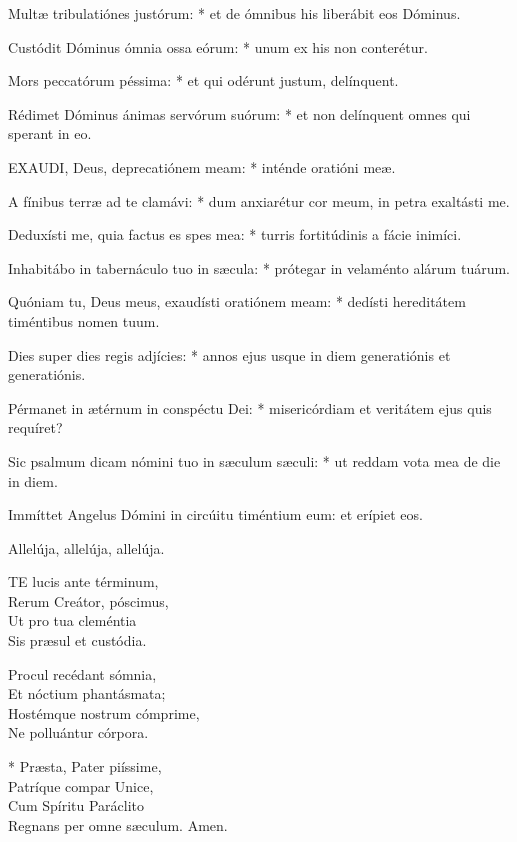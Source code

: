 Multæ tribulatiónes justórum: * et de ómnibus his liberábit eos Dóminus.

Custódit Dóminus ómnia ossa eórum: * unum ex his non conterétur.

Mors peccatórum péssima: * et qui odérunt justum, delínquent.

Rédimet Dóminus ánimas servórum suórum: * et non delínquent omnes qui sperant in eo.


\lettrine[lines=2]{E}{XAUDI}, Deus, deprecatiónem meam: * inténde oratióni meæ.

A fínibus terræ ad te clamávi: * dum anxiarétur cor meum, in petra exaltásti me.

Deduxísti me, quia factus es spes mea: * turris fortitúdinis a fácie inimíci.

Inhabitábo in tabernáculo tuo in sæcula: * prótegar in velaménto alárum tuárum.

Quóniam tu, Deus meus, exaudísti oratiónem meam: * dedísti hereditátem timéntibus nomen tuum.

Dies super dies regis adjícies: * annos ejus usque in diem generatiónis et generatiónis.

Pérmanet in ætérnum in conspéctu Dei: * misericórdiam et veritátem ejus quis requíret?

Sic psalmum dicam nómini tuo in sæculum sæculi: * ut reddam vota mea de die in diem.


 Immíttet Angelus Dómini in circúitu timéntium eum: et erípiet eos.


 Allelúja, allelúja, allelúja.


\lettrine[lines=2]{T}{E} lucis ante términum,\\
Rerum Creátor, póscimus,\\
Ut pro tua cleméntia\\
Sis præsul et custódia.

Procul recédant sómnia,\\
Et nóctium phantásmata;\\
Hostémque nostrum cómprime,\\
Ne polluántur córpora.

* Præsta, Pater piíssime,\\
Patríque compar Unice,\\
Cum Spíritu Paráclito\\
Regnans per omne sæculum. Amen.

